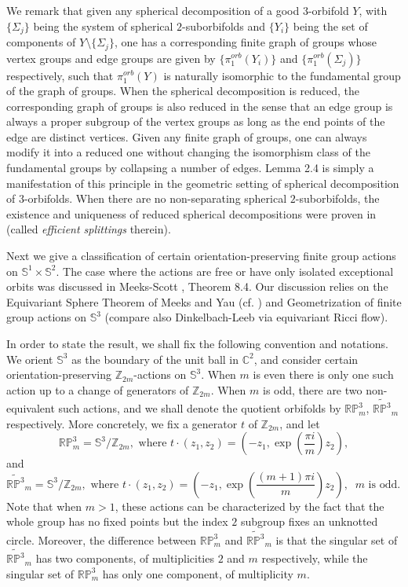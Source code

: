 \documentclass[11pt]{amsart}
\theoremstyle{plain}
\numberwithin{theorem}{section}
\theoremstyle{definition}
\begin{document}
We remark that given any spherical decomposition of a good $3$-orbifold $Y$, with 
$\{\Sigma_j\}$ being the system of spherical $2$-suborbifolds and $\{Y_i\}$
being the set of components of $Y\setminus \{\Sigma_j\}$,
one has a corresponding finite graph of groups whose vertex groups and 
edge groups are given by $\{\pi_1^{orb}(Y_i)\}$ and $\{\pi_1^{orb}(\Sigma_j)\}$
respectively, such that $\pi_1^{orb}(Y)$ 
is naturally isomorphic to the fundamental group of the graph of groups. When the 
spherical decomposition is reduced, the corresponding graph of groups is also reduced 
in the sense that an edge group is always a proper subgroup of the vertex groups 
as long as the end points of the edge are distinct vertices. Given any finite graph of 
groups, one can always modify it into a reduced one without changing the isomorphism 
class of the fundamental groups by collapsing a number of edges. Lemma 2.4 is simply 
a manifestation of this principle in the geometric setting of spherical decomposition of 
$3$-orbifolds. When there are no non-separating spherical $2$-suborbifolds, the existence 
and uniqueness of reduced spherical decompositions were proven in \cite{Pe} 
(called {\it efficient splittings} therein). 

Next we give a classification of certain orientation-preserving finite group actions on 
${{\mathbb S}}^1\times {{\mathbb S}}^2$. The case where the actions are free or have only isolated exceptional orbits 
was discussed in Meeks-Scott \cite{MS}, Theorem 8.4. Our discussion relies on the 
Equivariant Sphere Theorem of Meeks and Yau (cf. \cite{MY}) and Geometrization of
finite group actions on ${{\mathbb S}}^3$ (compare also Dinkelbach-Leeb \cite{DL} via equivariant Ricci flow). 

In order to state the result, we shall fix the following convention and notations. We orient ${{\mathbb S}}^3$ as the boundary of the unit ball in ${{\mathbb C}}^2$, and consider certain orientation-preserving ${{\mathbb Z}}_{2m}$-actions on 
${{\mathbb S}}^3$. When $m$ is even there is only one such action up to a change of generators of ${{\mathbb Z}}_{2m}$.
When $m$ is odd, there are two non-equivalent such actions, and we shall denote the quotient orbifolds
by ${{\mathbb R}}{{\mathbb P}}^3_m$, $\widetilde{{{\mathbb R}}{{\mathbb P}}^3}_m$ respectively. More concretely, we fix a generator $t$
of ${{\mathbb Z}}_{2m}$, and let 
$$
{{\mathbb R}}{{\mathbb P}}^3_m={{\mathbb S}}^3/{{\mathbb Z}}_{2m}, \mbox{ where } t\cdot (z_1,z_2)=(-z_1,\exp(\frac{\pi i}{m}) z_2), 
$$
and 
$$
\widetilde{{{\mathbb R}}{{\mathbb P}}^3}_m={{\mathbb S}}^3/{{\mathbb Z}}_{2m}, \mbox{ where } t\cdot (z_1,z_2)
=(-z_1,\exp(\frac{(m+1)\pi i}{m}) z_2), \;\; m \mbox { is odd. }
$$
Note that when $m>1$, these actions can be characterized by the fact that the whole group has no
fixed points but the index $2$ subgroup fixes an unknotted circle. Moreover, 
the difference between ${{\mathbb R}}{{\mathbb P}}^3_m$ and $\widetilde{{{\mathbb R}}{{\mathbb P}}^3}_m$ is that the singular
set of $\widetilde{{{\mathbb R}}{{\mathbb P}}^3}_m$ has two components, of multiplicities $2$ and $m$ respectively,
while the singular set of ${{\mathbb R}}{{\mathbb P}}^3_m$ has only one component, of multiplicity $m$.
\end{document}

